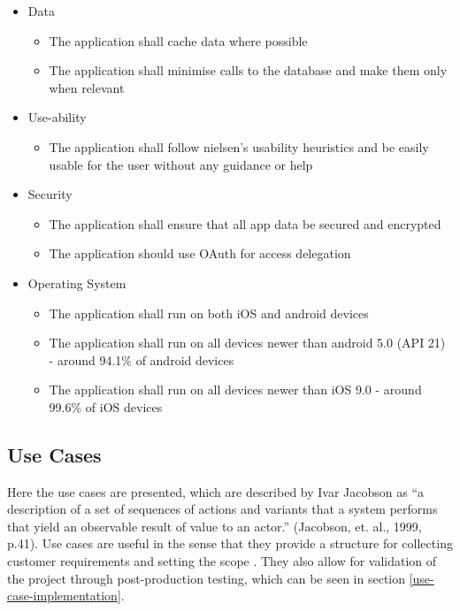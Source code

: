 \documentclass[12pt]{article}
\begin{document}
	\begin{itemize}
	\item Data
	\begin{itemize}
		\item The application shall cache data where possible
		\item The application shall minimise calls to the database and make them only when relevant
	\end{itemize}
	\end{itemize}

	\begin{itemize}
		\item Use-ability
		\begin{itemize}
			\item The application shall follow nielsen's usability heuristics and be easily usable for the user without any guidance or help
		\end{itemize}
	\end{itemize}

	\begin{itemize}
		\item Security
		\begin{itemize}
			\item The application shall ensure that all app data be secured and encrypted
			\item The application should use OAuth for access delegation
		\end{itemize}
	\end{itemize}

	\begin{itemize}
		\item Operating System
		\begin{itemize}
			\item The application shall run on both iOS and android devices
			\item The application shall run on all devices newer than android 5.0 (API 21) - around 94.1\% of android devices
			\item The application shall run on all devices newer than iOS 9.0 - around 99.6\% of iOS devices
		\end{itemize}
	\end{itemize}

	
	\subsection{Use Cases}
	Here the use cases are presented, which are described by Ivar Jacobson as “a description of a set of sequences of actions and variants that a system performs that yield an observable result of value to an actor.” (Jacobson, et. al., 1999, p.41). Use cases are useful in the sense that they provide a structure for collecting customer requirements and setting the scope \cite{larsonUseCasesWhat2004}. They also allow for validation of the project through post-production testing, which can be seen in section \autoref{use-case-implementation}.
	\\
	
\end{document}
